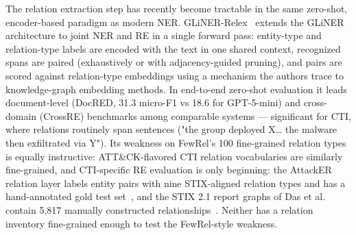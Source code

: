 \documentclass[11pt]{article}
\begin{document}
The relation extraction step has recently become tractable in the same zero-shot, encoder-based paradigm as modern NER. GLiNER-Relex~\citep{stepanov2026glinerrelex} extends the GLiNER architecture to joint NER and RE in a single forward pass: entity-type and relation-type labels are encoded with the text in one shared context, recognized spans are paired (exhaustively or with adjacency-guided pruning), and pairs are scored against relation-type embeddings using a mechanism the authors trace to knowledge-graph embedding methods. In end-to-end zero-shot evaluation it leads document-level (DocRED, 31.3 micro-F1 vs 18.6 for GPT-5-mini) and cross-domain (CrossRE) benchmarks among comparable systems — significant for CTI, where relations routinely span sentences ("the group deployed X… the malware then exfiltrated via Y"). Its weakness on FewRel's 100 fine-grained relation types is equally instructive: ATT\&CK-flavored CTI relation vocabularies are similarly fine-grained, and CTI-specific RE evaluation is only beginning: the AttackER relation layer labels entity pairs with nine STIX-aligned relation types and has a hand-annotated gold test set~\citep{oyenuga2026relation}, and the STIX 2.1 report graphs of Das et al. contain 5,817 manually constructed relationships~\citep{das2026structuring}. Neither has a relation inventory fine-grained enough to test the FewRel-style weakness.
\end{document}
